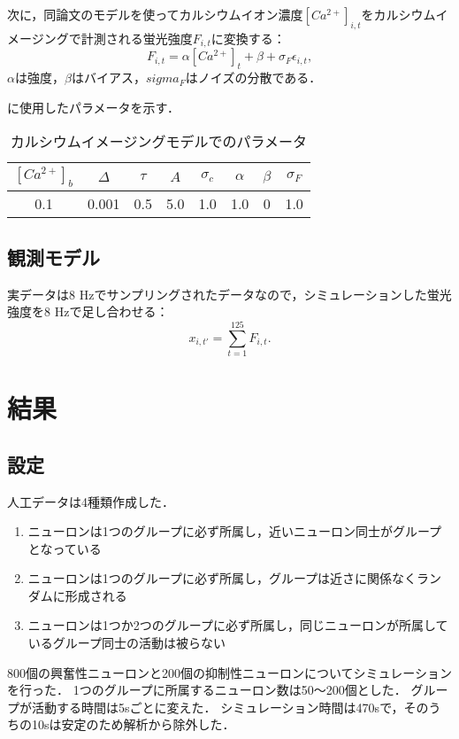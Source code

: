 次に，同論文のモデルを使ってカルシウムイオン濃度$[Ca^{2+}]_{i,t}$をカルシウムイメージングで計測される蛍光強度$F_{i,t}$に変換する：
\begin{equation}
  F_{i,t} = \alpha[Ca^{2+}]_t + \beta + \sigma_F \epsilon_{i,t},
  \label{eq:intensity}
\end{equation}
$\alpha$は強度，$\beta$はバイアス，$sigma_F$はノイズの分散である．

に使用したパラメータを示す．

\begin{table}[htb]
  \center
  \begin{tabular}{|cccccccc|} \hline
    $[Ca^{2+}]_b$ & $\Delta$ & $\tau$ & $A$ & $\sigma_c$ & $\alpha$ & $\beta$ & $\sigma_F$ \\ \hline
    0.1 & 0.001 & 0.5 & 5.0 & 1.0 & 1.0 & 0 & 1.0 \\ \hline
  \end{tabular}
  \caption{カルシウムイメージングモデルでのパラメータ}
  \label{tab:parameter2}
\end{table}

\subsection{観測モデル}
実データは8 Hzでサンプリングされたデータなので，シミュレーションした蛍光強度を8 Hzで足し合わせる：
\begin{equation}
  x_{i,t'} = \sum_{t=1}^{125} F_{i,t}.
  \label{eq:observation}
\end{equation}

\section{結果}
\subsection{設定}
人工データは4種類作成した．
\begin{enumerate}
  \item ニューロンは1つのグループに必ず所属し，近いニューロン同士がグループとなっている
  \item ニューロンは1つのグループに必ず所属し，グループは近さに関係なくランダムに形成される
  \item ニューロンは1つか2つのグループに必ず所属し，同じニューロンが所属しているグループ同士の活動は被らない
\end{enumerate}
800個の興奮性ニューロンと200個の抑制性ニューロンについてシミュレーションを行った．
1つのグループに所属するニューロン数は50〜200個とした．
グループが活動する時間は5sごとに変えた．
シミュレーション時間は470sで，そのうちの10sは安定のため解析から除外した．

